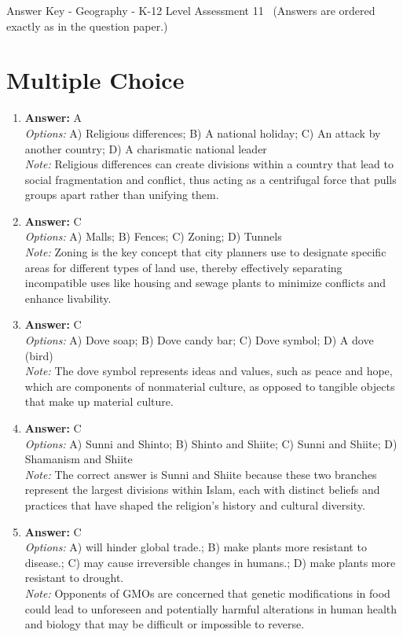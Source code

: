 \documentclass[12pt]{article}
\begin{document}
\begin{center}
Answer Key - Geography - K-12 Level Assessment 11 \
\small (Answers are ordered exactly as in the question paper.)
\end{center}

\section*{Multiple Choice}
\begin{enumerate}[label=\arabic*.]
\item \textbf{Answer:} A
\\ \textit{Options:} A) Religious differences; B) A national holiday; C) An attack by another country; D) A charismatic national leader
\\ \textit{Note:} Religious differences can create divisions within a country that lead to social fragmentation and conflict, thus acting as a centrifugal force that pulls groups apart rather than unifying them.
\item \textbf{Answer:} C
\\ \textit{Options:} A) Malls; B) Fences; C) Zoning; D) Tunnels
\\ \textit{Note:} Zoning is the key concept that city planners use to designate specific areas for different types of land use, thereby effectively separating incompatible uses like housing and sewage plants to minimize conflicts and enhance livability.
\item \textbf{Answer:} C
\\ \textit{Options:} A) Dove soap; B) Dove candy bar; C) Dove symbol; D) A dove (bird)
\\ \textit{Note:} The dove symbol represents ideas and values, such as peace and hope, which are components of nonmaterial culture, as opposed to tangible objects that make up material culture.
\item \textbf{Answer:} C
\\ \textit{Options:} A) Sunni and Shinto; B) Shinto and Shiite; C) Sunni and Shiite; D) Shamanism and Shiite
\\ \textit{Note:} The correct answer is Sunni and Shiite because these two branches represent the largest divisions within Islam, each with distinct beliefs and practices that have shaped the religion's history and cultural diversity.
\item \textbf{Answer:} C
\\ \textit{Options:} A) will hinder global trade.; B) make plants more resistant to disease.; C) may cause irreversible changes in humans.; D) make plants more resistant to drought.
\\ \textit{Note:} Opponents of GMOs are concerned that genetic modifications in food could lead to unforeseen and potentially harmful alterations in human health and biology that may be difficult or impossible to reverse.
\end{enumerate}
\end{document}
